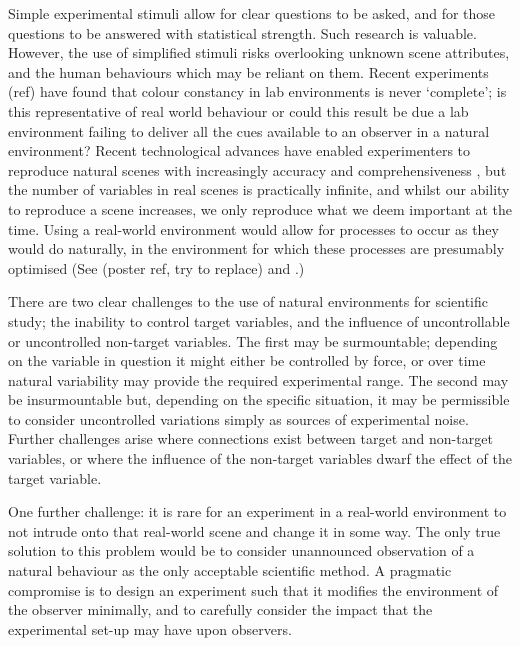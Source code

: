 Simple experimental stimuli allow for clear questions to be asked, and for those questions to be answered with statistical strength. Such research is valuable. However, the use of simplified stimuli risks overlooking unknown scene attributes, and the human behaviours which may be reliant on them. Recent experiments (ref) have found that colour constancy in lab environments is never `complete'; is this representative of real world behaviour or could this result be due a lab environment failing to deliver all the cues available to an observer in a natural environment? Recent technological advances have enabled experimenters to reproduce natural scenes with increasingly accuracy and comprehensiveness \citep{heasly_rendertoolbox3_2014}, but the number of variables in real scenes is practically infinite, and whilst our ability to reproduce a scene increases, we only reproduce what we deem important at the time. Using a real-world environment would allow for processes to occur as they would do naturally, in the environment for which these processes are presumably optimised (See \citet{kelly_chips_2017} (poster ref, try to replace) and \citet{shepard_perceptual_1992}.)

There are two clear challenges to the use of natural environments for scientific study; the inability to control target variables, and the influence of uncontrollable or uncontrolled non-target variables. The first may be surmountable; depending on the variable in question it might either be controlled by force, or over time natural variability may provide the required experimental range. The second may be insurmountable but, depending on the specific situation, it may be permissible to consider uncontrolled variations simply as sources of experimental noise. Further challenges arise where connections exist between target and non-target variables, or where the influence of the non-target variables dwarf the effect of the target variable.

One further challenge: it is rare for an experiment in a real-world environment to not intrude onto that real-world scene and change it in some way. The only true solution to this problem would be to consider unannounced observation of a natural behaviour as the only acceptable scientific method. A pragmatic compromise is to design an experiment such that it modifies the environment of the observer minimally, and to carefully consider the impact that the experimental set-up may have upon observers.

